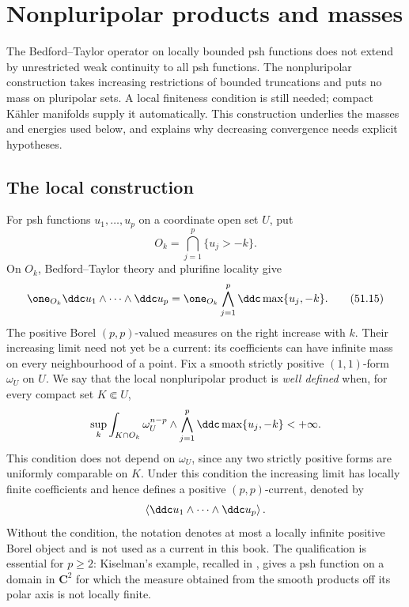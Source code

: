 \section{Nonpluripolar products and masses}
\label{sec:ch51-npp}

The Bedford--Taylor operator on locally bounded psh functions does not
extend by unrestricted weak continuity to all psh functions.
The nonpluripolar construction takes increasing restrictions of bounded
truncations and puts no mass on pluripolar sets.  A local finiteness
condition is still needed; compact K\"ahler manifolds supply it
automatically.  This construction underlies the masses and energies used
below, and explains why decreasing convergence needs explicit hypotheses.

\subsection{The local construction}
\label{sec:ch51-npp-local}

For psh functions $u_1,\ldots,u_p$ on a coordinate open set $U$, put
\[
 O_k=\bigcap_{j=1}^p\{u_j>-k\}.
\]
On $O_k$, Bedford--Taylor theory and plurifine locality give
\[
 \one_{O_k}\ddc u_1\wedge\cdots\wedge\ddc u_p
 =
 \one_{O_k}\bigwedge_{j=1}^p\ddc\max\{u_j,-k\}.
\tag{51.15}\label{eq:complex-npp-truncation}
\]
The positive Borel $(p,p)$-valued measures on the right increase with
$k$.  Their increasing limit need not yet be a current: its coefficients
can have infinite mass on every neighbourhood of a point.  Fix a smooth
strictly positive $(1,1)$-form $\omega_U$ on $U$.  We say that the
local nonpluripolar product is \emph{well defined} when, for every compact
set $K\Subset U$,
\[
 \sup_k\int_{K\cap O_k}\omega_U^{n-p}\wedge
       \bigwedge_{j=1}^p\ddc\max\{u_j,-k\}<+\infty.
\]
This condition does not depend on $\omega_U$, since any two strictly
positive forms are uniformly comparable on $K$.  Under this condition the
increasing limit has locally finite coefficients and hence defines a positive
$(p,p)$-current, denoted by
\[
              \left\langle\ddc u_1\wedge\cdots\wedge\ddc u_p\right\rangle .
\]
Without the condition, the notation denotes at most a locally infinite
positive Borel object and is not used as a current in this book.  The
qualification is essential for $p\geq2$: Kiselman's example, recalled in
\cite[Example~1.3]{BEGZ10}, gives a psh function on a domain in
$\mathbf C^2$ for which the measure obtained from the smooth products off
its polar axis is not locally finite.

